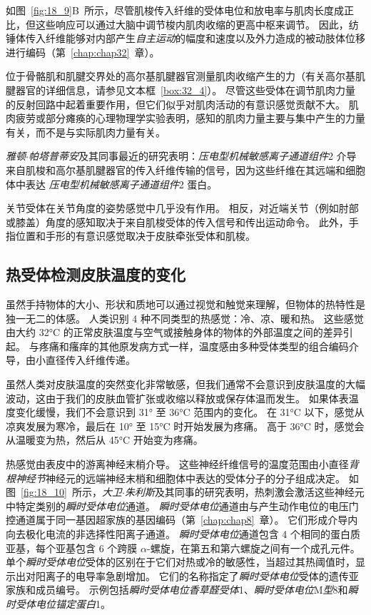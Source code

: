 如图~\ref{fig:18_9}B~所示，尽管肌梭传入纤维的受体电位和放电率与肌肉长度成正比，但这些响应可以通过大脑中调节梭内肌肉收缩的更高中枢来调节。
因此，纺锤体传入纤维能够对内部产生\textit{自主运动}的幅度和速度以及外力造成的被动肢体位移进行编码（第~\ref{chap:chap32}~章）。


位于骨骼肌和肌腱交界处的高尔基肌腱器官测量肌肉收缩产生的力（有关高尔基肌腱器官的详细信息，请参见文本框~\ref{box:32_4}）。
尽管这些受体在调节肌肉力量的反射回路中起着重要作用，但它们似乎对肌肉活动的有意识感觉贡献不大。
肌肉疲劳或部分瘫痪的心理物理学实验表明，感知的肌肉力量主要与集中产生的力量有关，而不是与实际肌肉力量有关。


\textit{雅顿$\cdot$帕塔普蒂安}及其同事最近的研究表明：\textit{压电型机械敏感离子通道组件}2 介导来自肌梭和高尔基肌腱器官的传入纤维传输的信号，因为这些纤维在其远端和细胞体中表达 \textit{压电型机械敏感离子通道组件}2 蛋白。


关节受体在关节角度的姿势感觉中几乎没有作用。
相反，对近端关节（例如肘部或膝盖）角度的感知取决于来自肌梭受体的传入信号和传出运动命令。
此外，手指位置和手形的有意识感觉取决于皮肤牵张受体和肌梭。



\subsection{热受体检测皮肤温度的变化}

虽然手持物体的大小、形状和质地可以通过视觉和触觉来理解，但物体的热特性是独一无二的体感。
人类识别 4 种不同类型的热感觉：冷、凉、暖和热。
这些感觉由大约 32°C 的正常皮肤温度与空气或接触身体的物体的外部温度之间的差异引起。
与疼痛和瘙痒的其他原发病方式一样，温度感由多种受体类型的组合编码介导，由小直径传入纤维传递。


虽然人类对皮肤温度的突然变化非常敏感，但我们通常不会意识到皮肤温度的大幅波动，这由于我们的皮肤血管扩张或收缩以释放或保存体温而发生。
如果体表温度变化缓慢，我们不会意识到 31° 至 36°C 范围内的变化。
在 31°C 以下，感觉从凉爽发展为寒冷，最后在 10° 至 15°C 时开始发展为疼痛。
高于 36°C 时，感觉会从温暖变为热，然后从 45°C 开始变为疼痛。


热感觉由表皮中的游离神经末梢介导。
这些神经纤维信号的温度范围由小直径\textit{背根神经节}神经元的远端神经末梢和细胞体中表达的受体分子的分子组成决定。
如图~\ref{fig:18_10}~所示，\textit{大卫$\cdot$朱利斯}及其同事的研究表明，热刺激会激活这些神经元中特定类别的\textit{瞬时受体电位}通道。
\textit{瞬时受体电位}通道由与产生动作电位的电压门控通道属于同一基因超家族的基因编码（第~\ref{chap:chap8}~章）。 
它们形成介导内向去极化电流的非选择性阳离子通道。
\textit{瞬时受体电位}通道包含 4 个相同的蛋白质亚基，每个亚基包含 6 个跨膜 $\alpha$-螺旋，在第五和第六螺旋之间有一个成孔元件。
单个\textit{瞬时受体电位}受体的区别在于它们对热或冷的敏感性，当超过其热阈值时，显示出对阳离子的电导率急剧增加。
它们的名称指定了\textit{瞬时受体电位}受体的遗传亚家族和成员编号。 
示例包括\textit{瞬时受体电位香草醛受体}1、\textit{瞬时受体电位}M\textit{型}8和\textit{瞬时受体电位锚定蛋白}1。



